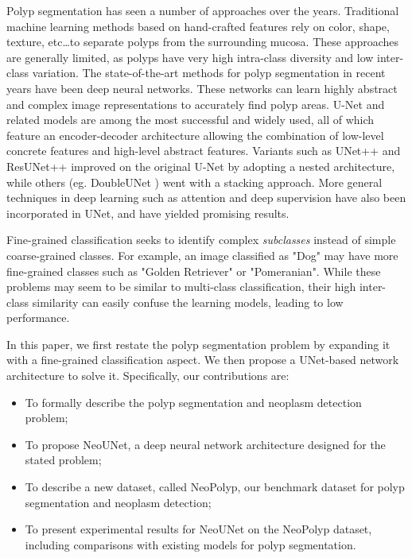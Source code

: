 \documentclass[runningheads]{llncs}
\newcommand{\ModelName}{NeoUNet\xspace}
\newcommand{\DatasetName}{NeoPolyp\xspace}
\begin{document}
	Polyp segmentation has seen a number of approaches over the years. Traditional machine learning methods based on hand-crafted features \cite{iwahori2013automatic,silva2014toward} rely on color, shape, texture, etc\dots to separate polyps from the surrounding mucosa. These approaches are generally limited, as polyps have very high intra-class diversity and low inter-class variation. The state-of-the-art methods for polyp segmentation in recent years have been deep neural networks. These networks can learn highly abstract and complex image representations to accurately find polyp areas. U-Net \cite{ronneberger2015u} and related models are among the most successful and widely used, all of which feature an encoder-decoder architecture allowing the combination of low-level concrete features and high-level abstract features. Variants such as UNet++ \cite{zhou2019unet++} and ResUNet++ \cite{jha2019resunet++} improved on the original U-Net by adopting a nested architecture, while others (eg. DoubleUNet \cite{jha2020doubleu}) went with a stacking approach. More general techniques in deep learning such as attention and deep supervision have also been incorporated in UNet, and have yielded promising results.

	Fine-grained classification seeks to identify complex \textit{subclasses} instead of simple coarse-grained classes. For example, an image classified as "Dog" may have more fine-grained classes such as "Golden Retriever" or "Pomeranian". While these problems may seem to be similar to multi-class classification, their high inter-class similarity can easily confuse the learning models, leading to low performance.

	In this paper, we first restate the polyp segmentation problem by expanding it with a fine-grained classification aspect. We then propose a UNet-based network architecture to solve it. Specifically, our contributions are:
	\begin{itemize}
		\item To formally describe the polyp segmentation and neoplasm detection problem;
		\item To propose \ModelName{}, a deep neural network architecture designed for the stated problem;
		\item To describe a new dataset, called  \DatasetName, our benchmark dataset for polyp segmentation and neoplasm detection;
		\item To present experimental results for \ModelName on the \DatasetName dataset, including comparisons with existing models for polyp segmentation.
	\end{itemize}
\end{document}

